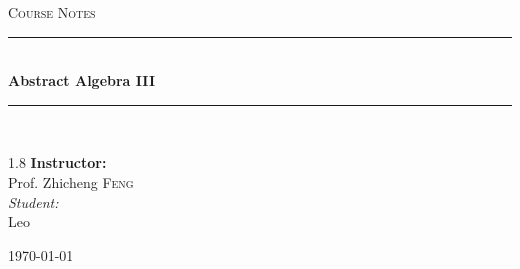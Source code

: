 \documentclass[11pt, a4paper]{report}
\newcommand{\HRule}[1]{\rule{\linewidth}{#1}}
\begin{document}
\begin{titlepage}
    \centering
    \vspace*{2cm}

    \textsc{\Large Course Notes}\\[0.5cm]

    \HRule{1.5pt} \\[0.5cm]
    { \huge \bfseries Abstract Algebra III }\\[0.4cm]
    \HRule{1.5pt} \\[1.5cm]

    \vspace{3cm}

    \begin{spacing}{1.8}
        {\Large \textbf{Instructor:}} \\
        {\Large Prof. Zhicheng \textsc{Feng}} \\[0.8cm]

        {\normalsize \textit{Student:}} \\
        {\normalsize Leo}
    \end{spacing}

    \vfill
    {\large \today}
\end{titlepage}
\newpage
\tableofcontents
\newpage

















\end{document}
